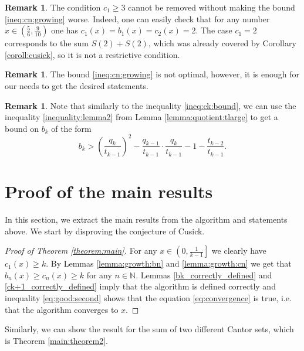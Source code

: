 \documentclass{amsart}
\theoremstyle{definition}
\newtheorem{remark}[theorem]{Remark}
\newcommand{\N}{\mathbb N}%
\newcommand{\0}{\mbf 0}%
\def\N{\mathbb N}
\begin{document}
\begin{remark}
The condition $c_1 \geq3$ cannot be removed without making the bound \eqref{ineq:cn:growing} worse. Indeed, one can easily check that for any number $x\in\left(\frac56,\frac9{10}\right)$ one has $c_1(x)=b_1(x)=c_2(x)=2$. The case $c_1=2$ corresponds to the sum $S(2)+S(2)$, which was already covered by Corollary \ref{coroll:cusick}, so it is not a restrictive condition.
\end{remark}

\begin{remark}
   The bound \eqref{ineq:cn:growing} is not optimal, however, it is enough for our needs to get the desired statements.
\end{remark}


\begin{remark}
   Note that similarly to the inequality \eqref{ineq:ck:bound}, we can use the inequality \eqref{inequality:lemma2} from Lemma \ref{lemma:quotient:tlarge} to get a bound on $b_k$ of the form
\begin{equation}\label{ineq:bk:bound}
    b_{k}> \left( \frac{q_{k}}{t_{k-1}} \right)^2 - \frac{q_{k-1}}{t_{k-1}} \cdot \frac{q_{k}}{t_{k-1}} - 1 -\frac{t_{k-2}}{t_{k-1}}.
\end{equation}
\end{remark}



\section{Proof of the main results}\label{sec:proofs}

In this section, we extract the main results from the algorithm and statements above. We start by disproving the conjecture of Cusick.
\begin{proof}[Proof of Theorem \ref{theorem:main}]
For any $x\in\left(0, \frac{1}{k-1} \right]$ we clearly have $c_1(x)\geq k$. By Lemmas \ref{lemma:growth:bn} and \ref{lemma:growth:cn} we get that $b_n(x)\geq c_n(x) \geq k$ for any $n\in\N$. Lemmas \ref{bk_correctly_defined} and \ref{ck+1_correctly_defined} imply that the algorithm is defined correctly and inequality \eqref{eq:good:second} shows that the equation \eqref{eq:convergence} is true, i.e. that the algorithm converges to $x$.
\end{proof}


Similarly, we can show the result for the sum of two different Cantor sets, which is Theorem \ref{main:theorem2}.
\end{document}
